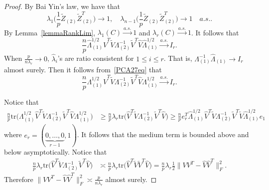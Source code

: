 \begin{proof}
    By Bai Yin's law, we have that
    \begin{equation*}
        \lambda_1\big(\frac{1}{p}\tilde{Z}_{(2)}\tilde{Z}_{(2)}^T\big)\to 1,\quad
        \lambda_{n-1}\big(\frac{1}{p}\tilde{Z}_{(2)}\tilde{Z}_{(2)}^T\big)\to 1\quad  a.s..
    \end{equation*}
    By Lemma~\ref{lemmaRankLim}, $\lambda_{1}(C)\xrightarrow{a.s.}1$ and $\lambda_{r}(C)\xrightarrow{a.s.}1$. It follows that
    \begin{equation}\label{PCA27eq}
        \frac{n}{p}\hat{\Lambda}_{(1)}^{1/2}\hat{V}^T \tilde{V}\Lambda^{-1}_{(2)}\tilde{V}^T \hat{V}\hat{\Lambda}_{(1)}^{1/2}\xrightarrow{a.s.} I_r.
    \end{equation}
    When $\frac{p}{n\lambda_r}\to 0$, $\hat{\lambda}_i$'s are ratio consistent for $1\leq i\leq r$. That is, $\Lambda_{(1)}^{-1}\hat{\Lambda}_{(1)}\to I_r$ almost surely. Then it follows from~\eqref{PCA27eq} that
    \begin{equation}
        \frac{n}{p}\Lambda_{(1)}^{1/2}\hat{V}^T \tilde{V}\Lambda^{-1}_{(2)}\tilde{V}^T \hat{V}\Lambda_{(1)}^{1/2}\xrightarrow{a.s.} I_r.
    \end{equation}

    Notice that
    \begin{equation*}
        \begin{aligned}
         \frac{n}{p}   \mathrm{tr}\big(\Lambda_{(1)}^{1/2}\hat{V}^T \tilde{V}\Lambda^{-1}_{(2)}\tilde{V}^T \hat{V}\Lambda_{(1)}^{1/2}\big)&\geq
          \frac{n}{p}  \lambda_r\mathrm{tr}\big(\hat{V}^T \tilde{V}\Lambda^{-1}_{(2)}\tilde{V}^T \hat{V}\big)
            \geq
          \frac{n}{p}  e_r^T \hat{\Lambda}_{(1)}^{1/2}\hat{V}^T\tilde{V}\Lambda_{(2)}^{-1}\tilde{V}^T\tilde{V}\hat{\Lambda}_{(1)}^{1/2}e_1
        \end{aligned}
    \end{equation*}
    where $e_r=(\underbrace{0,\ldots,0}_{r-1},1)$. It follows that the medium term is bounded above and below asymptotically. Notice that
    \begin{equation*}
        \begin{aligned}
            \frac{n}{p}\lambda_r\mathrm{tr}\big(\hat{V}^T \tilde{V}\Lambda^{-1}_{(2)}\tilde{V}^T \hat{V}\big)
            &\asymp
            \frac{n}{p}\lambda_r\mathrm{tr}\big(\hat{V}^T \tilde{V}\tilde{V}^T \hat{V}\big)
            =\frac{n}{p}\lambda_r\frac{1}{2}\|VV^T -\hat{V}\hat{V}^T\|^2_F.
        \end{aligned}
    \end{equation*}
     Therefore
    $\|VV^T -\hat{V}\hat{V}^T\|^2_F\asymp \frac{p}{n\lambda_r}$ almost surely.


\end{proof}
